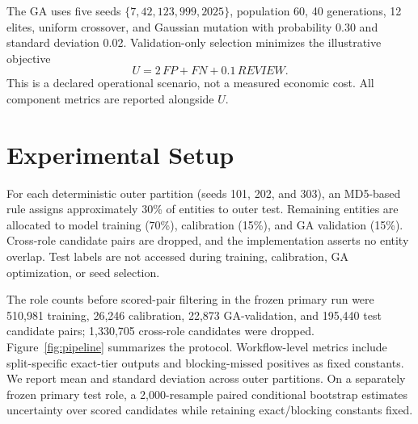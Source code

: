 \documentclass[conference]{IEEEtran}
\begin{document}
The GA uses five seeds $\{7,42,123,999,2025\}$, population 60, 40 generations, 12 elites, uniform crossover, and Gaussian mutation with probability 0.30 and standard deviation 0.02. Validation-only selection minimizes the illustrative objective
\begin{equation}
U=2\,FP+FN+0.1\,REVIEW.
\end{equation}
This is a declared operational scenario, not a measured economic cost. All component metrics are reported alongside $U$.

\section{Experimental Setup}
For each deterministic outer partition (seeds 101, 202, and 303), an MD5-based rule assigns approximately 30\% of entities to outer test. Remaining entities are allocated to model training (70\%), calibration (15\%), and GA validation (15\%). Cross-role candidate pairs are dropped, and the implementation asserts no entity overlap. Test labels are not accessed during training, calibration, GA optimization, or seed selection.

The role counts before scored-pair filtering in the frozen primary run were 510,981 training, 26,246 calibration, 22,873 GA-validation, and 195,440 test candidate pairs; 1,330,705 cross-role candidates were dropped. Figure~\ref{fig:pipeline} summarizes the protocol. Workflow-level metrics include split-specific exact-tier outputs and blocking-missed positives as fixed constants. We report mean and standard deviation across outer partitions. On a separately frozen primary test role, a 2,000-resample paired conditional bootstrap estimates uncertainty over scored candidates while retaining exact/blocking constants fixed.
\end{document}
